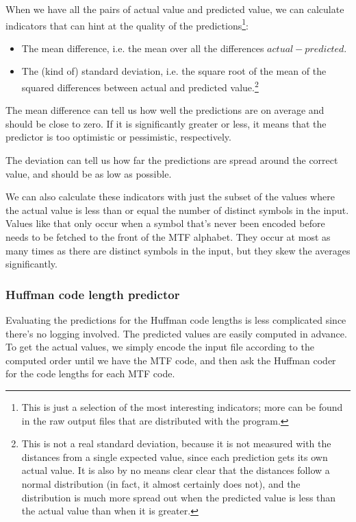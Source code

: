 \documentclass[a4paper]{scrreprt}
\begin{document}
When we have all the pairs of actual value and predicted value, we can calculate
indicators that can hint at the quality of the predictions\footnote{This is
just a selection of the most interesting indicators; more can be found in the
raw output files that are distributed with the program.}:
\begin{itemize}
  \item The mean difference, i.e. the mean over all the differences \(actual -
  predicted\).
  \item The (kind of) standard deviation, i.e. the square root of the mean of
  the squared differences between actual and predicted value.\footnote{This is
  not a real standard deviation, because it is not measured with the distances
  from a single expected value, since each prediction gets its own actual 
  value. It is also by no means clear clear that the distances follow a normal
  distribution (in fact, it almost certainly does not), and the distribution is
  much more spread out when the predicted value is less than the actual value
  than when it is greater.}
\end{itemize}

The mean difference can tell us how well the predictions are on average and
should be close to zero. If it is significantly greater or less, it means that
the predictor is too optimistic or pessimistic, respectively.

The deviation can tell us how far the predictions are spread around the correct
value, and should be as low as possible.

We can also calculate these indicators with just the subset of the values where
the actual value is less than or equal the number of distinct symbols in the
input. Values like that only occur when a symbol that's never been encoded
before needs to be fetched to the front of the MTF alphabet. They occur at most
as many times as there are distinct symbols in the input, but they skew the
averages significantly.


\subsubsection{Huffman code length predictor}

Evaluating the predictions for the Huffman code lengths is less complicated
since there's no logging involved. The predicted values are easily computed in
advance. To get the actual values, we simply encode the input file according to
the computed order until we have the MTF code, and then ask the Huffman coder
for the code lengths for each MTF code.
\end{document}
